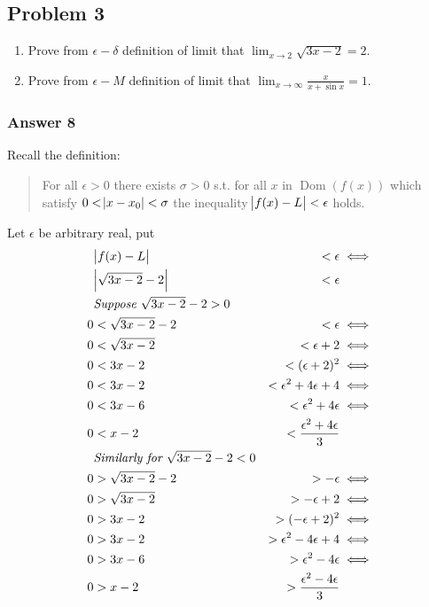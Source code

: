 \documentclass[a4paper]{article}
\DeclareMathOperator{\Dom}{Dom}
\begin{document}
\subsection{Problem 3}
\label{sec:orgheadline12}
\begin{enumerate}
\item Prove from \(\epsilon-\delta\) definition of limit that 
\(\lim_{x \to 2}\sqrt{3x - 2} = 2\).
\item Prove from \(\epsilon-M\) definition of limit that 
\(\lim_{x \to \infty}\frac{x}{x+\sin x} = 1\).
\end{enumerate}

\subsubsection{Answer 8}
\label{sec:orgheadline10}
Recall the definition:
\begin{quote}
For all \(\epsilon > 0\) there exists \(\sigma > 0\) s.t. for all \(x\) in
\(\Dom(f(x))\) which satisfy \(0 < \abs{x - x_0} < \sigma\) the inequality
\(\abs{f(x) - L} < \epsilon\) holds.
\end{quote}

Let \(\epsilon\) be arbitrary real, put
\begin{equation*}
  \begin{aligned}
      &\abs{f(x) - L}          &< \epsilon                         &\iff \\
      &\abs{\sqrt{3x - 2} - 2} &< \epsilon                               \\
      &\textit{Suppose $\sqrt{3x - 2} - 2 > 0$}                          \\
    0 &< \sqrt{3x - 2} - 2     &< \epsilon                         &\iff \\
    0 &< \sqrt{3x - 2}         &< \epsilon + 2                     &\iff \\
    0 &< 3x - 2                &< (\epsilon + 2)^2                 &\iff \\
    0 &< 3x - 2                &< \epsilon^2 + 4\epsilon + 4       &\iff \\
    0 &< 3x - 6                &< \epsilon^2 + 4\epsilon           &\iff \\
    0 &< x - 2                 &< \frac{\epsilon^2 + 4\epsilon}{3}       \\
      &\textit{Similarly for $\sqrt{3x - 2} - 2 < 0$}                    \\
    0 &> \sqrt{3x - 2} - 2     &> -\epsilon                        &\iff \\
    0 &> \sqrt{3x - 2}         &> -\epsilon + 2                    &\iff \\
    0 &> 3x - 2                &> (-\epsilon + 2)^2                &\iff \\
    0 &> 3x - 2                &> \epsilon^2 - 4\epsilon + 4       &\iff \\
    0 &> 3x - 6                &> \epsilon^2 - 4\epsilon           &\iff \\
    0 &> x - 2                 &> \frac{\epsilon^2 - 4\epsilon}{3}
  \end{aligned}
\end{equation*}
\end{document}
